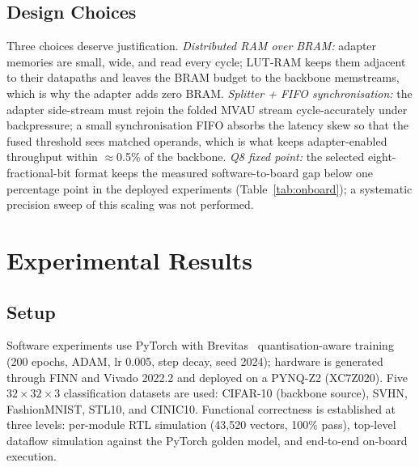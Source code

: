 \documentclass[journal]{IEEEtran}
\begin{document}
\begin{table}[!t]
\centering
\caption{Two-task vs.\ $N$-task switching: same mechanism, two depths.}
\label{tab:twovsn}
\small
\setlength{\tabcolsep}{3.5pt}
\end{table}

\subsection{Design Choices}
Three choices deserve justification. \emph{Distributed RAM over BRAM:} adapter memories are small, wide, and read every cycle; LUT-RAM keeps them adjacent to their datapaths and leaves the BRAM budget to the backbone memstreams, which is why the adapter adds zero BRAM. \emph{Splitter + FIFO synchronisation:} the adapter side-stream must rejoin the folded MVAU stream cycle-accurately under backpressure; a small synchronisation FIFO absorbs the latency skew so that the fused threshold sees matched operands, which is what keeps adapter-enabled throughput within $\approx$0.5\% of the backbone. \emph{Q8 fixed point:} the selected eight-fractional-bit format keeps the measured software-to-board gap below one percentage point in the deployed experiments (Table~\ref{tab:onboard}); a systematic precision sweep of this scaling was not performed.

\section{Experimental Results}
\subsection{Setup}
Software experiments use PyTorch with Brevitas~\cite{Pappalardo2021Brevitas} quantisation-aware training (200 epochs, ADAM, lr 0.005, step decay, seed 2024); hardware is generated through FINN and Vivado 2022.2 and deployed on a PYNQ-Z2 (XC7Z020). Five $32{\times}32{\times}3$ classification datasets are used: CIFAR-10 (backbone source), SVHN, FashionMNIST, STL10, and CINIC10. Functional correctness is established at three levels: per-module RTL simulation (43{,}520 vectors, 100\% pass), top-level dataflow simulation against the PyTorch golden model, and end-to-end on-board execution.
\end{document}
